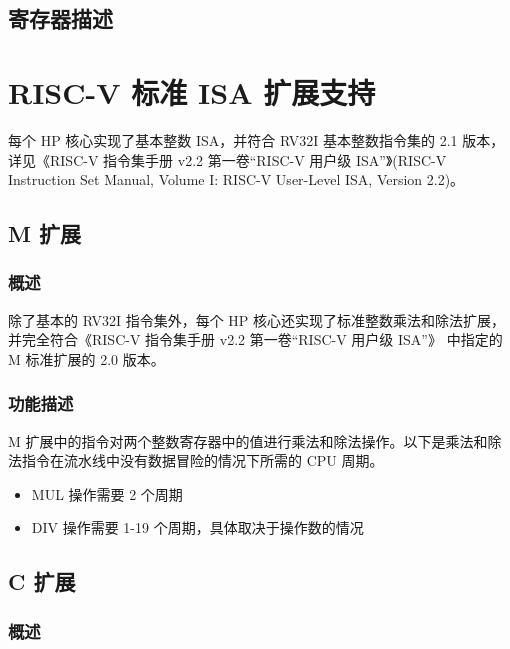 \documentclass[main\_\_CN.tex]{subfiles}
\begin{document}
\subsection{寄存器描述}



\newpage
\section{RISC-V 标准 ISA 扩展支持}

每个 HP 核心实现了基本整数 ISA，并符合 RV32I 基本整数指令集的 2.1 版本，详见《RISC-V 指令集手册 v2.2 第一卷“RISC-V 用户级 ISA”》(RISC-V Instruction Set Manual, Volume I: RISC-V User-Level ISA, Version 2.2)。

\subsection{M 扩展}
\label{sec:riscvcpu-mext}
\subsubsection{概述}
\label{sec:riscvcpu-mext-overview}
除了基本的 RV32I 指令集外，每个 HP 核心还实现了标准整数乘法和除法扩展，并完全符合《RISC-V 指令集手册 v2.2 第一卷“RISC-V 用户级 ISA”》 中指定的 M 标准扩展的 2.0 版本。

\subsubsection{功能描述}

\label{sec:riscvcpu-mext-func-descr}
M 扩展中的指令对两个整数寄存器中的值进行乘法和除法操作。以下是乘法和除法指令在流水线中没有数据冒险的情况下所需的 CPU 周期。
\begin{itemize}
    \item MUL 操作需要 2 个周期
    \item DIV 操作需要 1-19 个周期，具体取决于操作数的情况
\end{itemize}


\subsection{C 扩展}
\label{sec:riscvcpu-cext}
\subsubsection{概述}
\end{document}
